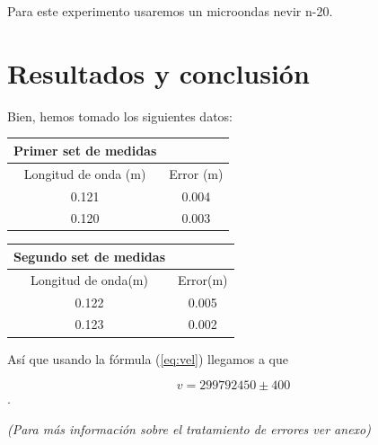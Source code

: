 \documentclass{article}
\begin{document}
Para este experimento usaremos un microondas nevir n-20.

\section{Resultados y conclusión}
Bien, hemos tomado los siguientes datos:  

\begin{minipage}{0.5\linewidth}
\begin{tabular}{c|c}
    \multicolumn{1}{c}{Primer set de medidas}&   \\ \hline
     Longitud de onda (m) & Error (m)\\ \hline
     0.121 & 0.004 \\ \hline
     0.120 & 0.003 \\ \hline
\end{tabular}
\end{minipage}
\begin{minipage}{0.5\linewidth}
\begin{tabular}{c|c}
    \multicolumn{1}{c}{Segundo set de medidas}&   \\ \hline
     Longitud de onda(m) & Error(m) \\ \hline 
     0.122 & 0.005 \\ \hline
     0.123 & 0.002 \\ \hline
\end{tabular}
\end{minipage}

Así que usando la fórmula (\ref{eq:vel}) llegamos a que 

$$v = 299792450 \pm 400$$.

\textit{(Para más información sobre el tratamiento de errores ver anexo)}


\end{document}
